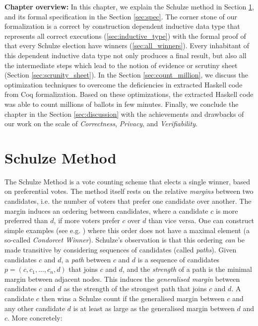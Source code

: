  
 
 \textbf{Chapter overview:} In this chapter, we explain the Schulze method in Section \ref{sec:schulze_algorithm}, 
 and its formal specification in the Section \ref{sec:spec}. The  corner stone of our formalization is 
 a correct by construction dependent inductive data type 
 that represents all correct executions (\ref{sec:inductive_type}) with the formal proof of
 that every Schulze election have winners (\ref{sec:all_winners}).  Every inhabitant of 
 this dependent inductive data type not only produces a final result, but also all the 
 intermediate steps which lead to the notion of evidence or scrutiny sheet (Section 
  \ref{sec:scrunity_sheet}).  In the Section \ref{sec:count_million}, we discuss the optimization techniques
   to overcome the deficiencies in extracted Haskell code from Coq formalization. Based on 
   these optimizations, the extracted Haskell code was able to count millions of ballots in few 
   minutes. 
   Finally, we conclude the chapter in the Section \ref{sec:discussion} with 
   the achievements and drawbacks of our work on the scale of \textit{Correctness},
   \textit{Privacy}, and \textit{Verifiability}.
 



\section{Schulze Method}
\label{sec:schulze_algorithm}
The Schulze Method \citep{Schulze:2011:NMC} is a vote counting scheme
that elects a single winner, based on preferential votes. 
The method itself rests on the relative 
\emph{margins} between two candidates, i.e. the number of
voters that prefer one candidate over another.  The margin induces
an ordering between candidates, where a candidate $c$ is more
preferred than $d$, if more voters prefer $c$ over $d$ than 
vice versa. One can construct simple examples (see e.g.
\citep{Rivest:2010:OSW}) where this order does not have a maximal
element (a so-called \emph{Condorcet Winner}). Schulze's observation
is that this ordering \emph{can} be made transitive by considering
sequences of candidates (called \emph{paths}). Given candidates $c$
and $d$, a \emph{path} between $c$ and $d$ is a sequence of candidates
 $p = (c, c_1,\dots, c_n, d)$ that joins $c$ and $d$, and 
 the \emph{strength} of a
path is the minimal margin between adjacent nodes. This induces the
\emph{generalised margin} between candidates $c$ and $d$ as the
strength of the strongest path that joins $c$ and $d$. A candidate
$c$ then wins a Schulze count if the generalised margin between $c$
and any other candidate $d$ is at least as large as the generalised
margin between $d$ and $c$. More concretely:

